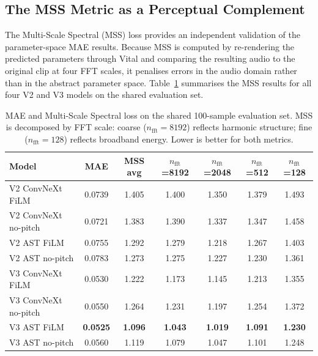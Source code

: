 \subsection{The MSS Metric as a Perceptual Complement}

\noindent
The Multi-Scale Spectral (MSS) loss provides an independent validation of the parameter-space MAE results. Because MSS is computed by re-rendering the predicted parameters through Vital and comparing the resulting audio to the original clip at four FFT scales, it penalises errors in the audio domain rather than in the abstract parameter space. Table~\ref{tab:mss_summary} summarises the MSS results for all four V2 and V3 models on the shared evaluation set.

\begin{table}[H]
\centering
\renewcommand{\arraystretch}{1.3}
\begin{tabular}{lcccccc}
\hline
\textbf{Model} & \textbf{MAE} & \textbf{MSS avg} & \textbf{$n_\text{fft}$=8192} & \textbf{$n_\text{fft}$=2048} & \textbf{$n_\text{fft}$=512} & \textbf{$n_\text{fft}$=128} \\
\hline
V2 ConvNeXt FiLM    & 0.0739 & 1.405 & 1.400 & 1.350 & 1.379 & 1.493 \\
V2 ConvNeXt no-pitch & 0.0721 & 1.383 & 1.390 & 1.337 & 1.347 & 1.458 \\
V2 AST FiLM          & 0.0755 & 1.292 & 1.279 & 1.218 & 1.267 & 1.403 \\
V2 AST no-pitch      & 0.0783 & 1.273 & 1.275 & 1.227 & 1.230 & 1.361 \\
\hline
V3 ConvNeXt FiLM    & 0.0530 & 1.222 & 1.173 & 1.145 & 1.213 & 1.355 \\
V3 ConvNeXt no-pitch & 0.0550 & 1.264 & 1.231 & 1.197 & 1.254 & 1.372 \\
V3 AST FiLM          & \textbf{0.0525} & \textbf{1.096} & \textbf{1.043} & \textbf{1.019} & \textbf{1.091} & \textbf{1.230} \\
V3 AST no-pitch      & 0.0560 & 1.119 & 1.079 & 1.047 & 1.101 & 1.248 \\
\hline
\end{tabular}
\vspace{0.3cm}
\caption{MAE and Multi-Scale Spectral loss on the shared 100-sample evaluation set. MSS is decomposed by FFT scale: coarse ($n_\text{fft}=8192$) reflects harmonic structure; fine ($n_\text{fft}=128$) reflects broadband energy. Lower is better for both metrics.}
\label{tab:mss_summary}
\end{table}

